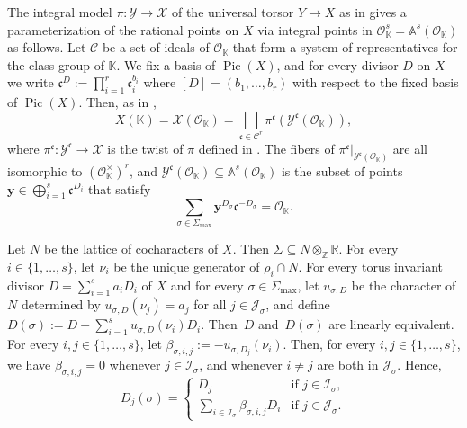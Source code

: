 \documentclass[JEP,XML,SOM,Unicode,published]{cedram}
\newcommand{\bfy}{\boldsymbol{y}}
\newcommand{\OO}{\mathcal{O}}
\newcommand\ZZ{\mathbb{Z}}
\newcommand\RR{\mathbb{R}}
\newcommand{\KK}{\mathbb{K}}
\newcommand{\A}{\mathbb{A}}
\newcommand{\gen}[1]{\nu_{#1}}
\newcommand{\ii}[1]{\mathcal{J}_{#1}}
\newcommand{\ic}[1]{\mathcal{I}_{#1}}
\DeclareMathOperator{\pic}{Pic}
\theoremstyle{definition}
\numberwithin{theorem}{section}
\begin{document}
The integral model $\pi:\mathscr{Y}\to\mathscr{X}$ of the universal torsor $Y\to X$
as in \cite[Rem.\,8.6]{MR1679841} gives a parameterization of the rational points
on $X$ via integral points in $\OO_{\KK}^s=\A^s(\OO_{\KK})$ as follows.
Let $\mathcal{C}$ be a set of ideals of $\OO_{\KK}$ that form a system of representatives
for the class group of $\KK$.
We fix a basis of $\pic(X)$, and
for every divisor $D$ on $X$ we write $\mathfrak c^{D}:=\prod_{i=1}^r \mathfrak c_i^{b_i}$ where
$[D]=(b_1,\dots,b_r)$ with respect to the fixed basis of $\pic(X)$.
Then, as in \cite[\S2]{MR3514738},
\[
X(\KK)=\mathscr X(\OO_{\KK})=
\bigsqcup_{\mathfrak c\in\mathcal C^{r}}\pi^{\mathfrak c}
\left(\mathscr{Y}^{\mathfrak c}(\OO_{\KK})\right),
\]
where $\pi^{\mathfrak c}:\mathscr{Y}^{\mathfrak c}\to\mathscr X$ is the twist
of $\pi$ defined in \cite[Th.\,2.7]{MR3552013}.
The fibers of $\pi^{\mathfrak c}|_{\mathscr{Y}^{\mathfrak c}(\OO_{\KK})}$ are all isomorphic to
$(\OO_{\KK}^\times)^{r}$, and
$\mathscr{Y}^{\mathfrak c}(\OO_{\KK})\subseteq \A^s(\OO_{\KK})$ is the subset of
points $\bfy\in \bigoplus_{i=1}^s\mathfrak c^{D_i}$ that satisfy
\begin{equation}
\label{eq:coprimality_condition}
\sum_{\sigma\in\Sigma_{\max}}\bfy^{D_\sigma}\mathfrak c^{-D_\sigma}=\OO_{\KK}.
\end{equation}

Let $N$ be the lattice of cocharacters of $X$. Then $\Sigma\subseteq N\otimes_\ZZ\RR$.
For every $i\in\{1,\dots,s\}$, let $\gen{i}$ be the unique generator of $\rho_i\cap N$.
For every torus invariant divisor $D=\sum_{i=1}^s a_i D_i$ of $X$ and for every
$\sigma\in\Sigma_{\max}$, let $u_{\sigma,D}$ be the character of $N$ deter\-mined by
$u_{\sigma,D}(\gen{j})=a_j$ for all $j\in\ii{\sigma}$, and define
$D(\sigma):=D-\sum_{i=1}^su_{\sigma,D}(\gen{i})D_i$.
Then~$D$ and~$D(\sigma)$ are linearly equivalent.
For every $i,j\in\{1,\dots,s\}$, let $\beta_{\sigma,i,j}:=-u_{\sigma,D_{j}}(\gen{i})$.
Then, for every $i,j \in\{1,\dots,s\}$, we have $\beta_{\sigma,i,j}=0$ whenever
$j\in\ic{\sigma}$, and whenever $i \neq j$ are both in $\ii{\sigma}$. Hence,
\begin{equation}
\label{eq:D_rho_sigma}
D_{j}(\sigma)=\begin{cases}
D_{j} & \text{if } j\in\ic{\sigma},\\
\sum_{i\in\ic{\sigma}}\beta_{\sigma,i,j}D_{i} & \text{if } j\in\ii{\sigma}.
\end{cases}
\end{equation}
\end{document}
